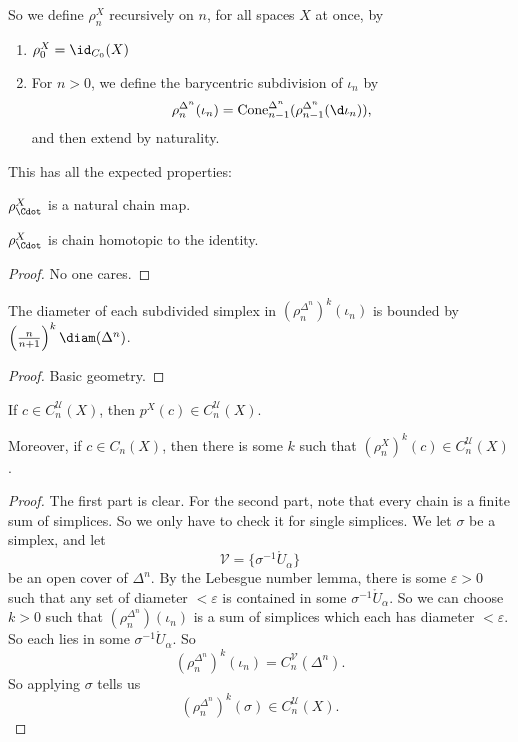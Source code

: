 \documentclass[a4paper]{article}
\begin{document}
So we define $\rho_n^X$ recursively on $n$, for all spaces $X$ at once, by
\begin{enumerate}
  \item $\rho_0^X = \id_{C_0}(X)$
  \item For $n > 0$, we define the barycentric subdivision of $\iota_n$ by
    \[
      \rho_n^{\Delta^n}(\iota_n) = \mathrm{Cone}_{n - 1}^{\Delta^n} (\rho_{n - 1}^{\Delta^n} (\d \iota_n)),
    \]
    and then extend by naturality.
\end{enumerate}

This has all the expected properties:
\begin{lemma}
  $\rho_\Cdot^X$ is a natural chain map.
\end{lemma}

\begin{lemma}
  $\rho_\Cdot^X$ is chain homotopic to the identity.
\end{lemma}

\begin{proof}
  No one cares.
\end{proof}

\begin{lemma}
  The diameter of each subdivided simplex in $(\rho_n^{\Delta^n})^k(\iota_n)$ is bounded by $\left(\frac{n}{n + 1}\right)^k \diam(\Delta^n)$.
\end{lemma}

\begin{proof}
  Basic geometry.
\end{proof}

\begin{prop}
  If $c \in C_n^\mathcal{U}(X)$, then $p^X(c) \in C_n^{\mathcal{U}}(X)$.

  Moreover, if $c \in C_n(X)$, then there is some $k$ such that $(\rho_n^{X})^k(c) \in C_n^{\mathcal{U}}(X)$.
\end{prop}

\begin{proof}
  The first part is clear. For the second part, note that every chain is a finite sum of simplices. So we only have to check it for single simplices. We let $\sigma$ be a simplex, and let
  \[
    \mathcal{V} = \{\sigma^{-1} \mathring{U}_\alpha\}
  \]
  be an open cover of $\Delta^n$. By the Lebesgue number lemma, there is some $\varepsilon > 0$ such that any set of diameter $< \varepsilon$ is contained in some $\sigma^{-1} \mathring{U}_\alpha$. So we can choose $k > 0$ such that $(\rho_n^{\Delta^n}) (\iota_n)$ is a sum of simplices which each has diameter $< \varepsilon$. So each lies in some $\sigma^{-1}\mathring{U}_\alpha$. So
  \[
    (\rho_n^{\Delta^n})^k (\iota_n) = C_n^{\mathcal{V}} (\Delta^n).
  \]
  So applying $\sigma$ tells us
  \[
    (\rho_n^{\Delta^n})^k (\sigma) \in C_n^\mathcal{U}(X).
  \]
\end{proof}
\end{document}
